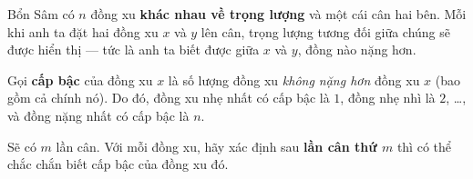 Bổn Sâm có $n$ đồng xu \textbf{khác nhau về trọng lượng} và một cái cân hai bên.  
Mỗi khi anh ta đặt hai đồng xu $x$ và $y$ lên cân, trọng lượng tương đối giữa chúng sẽ được hiển thị --- tức là anh ta biết được giữa $x$ và $y$, đồng nào nặng hơn.

Gọi \textbf{cấp bậc} của đồng xu $x$ là số lượng đồng xu \textit{không nặng hơn} đồng xu $x$ (bao gồm cả chính nó).  
Do đó, đồng xu nhẹ nhất có cấp bậc là $1$, đồng nhẹ nhì là $2$, \ldots, và đồng nặng nhất có cấp bậc là $n$.

Sẽ có $m$ lần cân. Với mỗi đồng xu, hãy xác định sau \textbf{lần cân thứ $m$} thì có thể chắc chắn biết cấp bậc của đồng xu đó.
